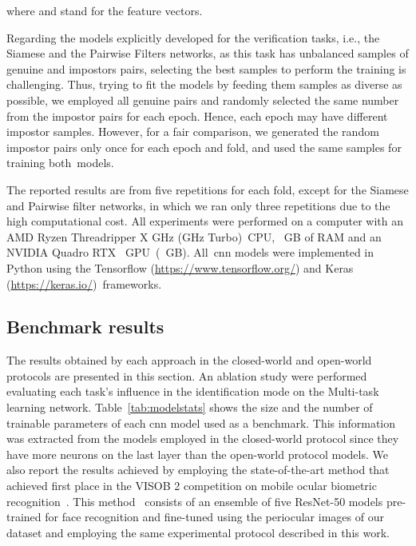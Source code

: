 \noindent where  and  stand for the feature vectors.

Regarding the models explicitly developed for the verification tasks, i.e., the Siamese and the Pairwise Filters networks, as this task has unbalanced samples of genuine and impostors pairs, selecting the best samples to perform the training is challenging.
Thus, trying to fit the models by feeding them samples as diverse as possible, we employed all genuine pairs and randomly selected the same number from the impostor pairs for each epoch.
Hence, each epoch may have different impostor samples.
However, for a fair comparison, we generated the random impostor pairs only once for each epoch and fold, and used the same samples for training both~models.

The reported results are from five repetitions for each fold, except for the Siamese and Pairwise filter networks, in which we ran only three repetitions due to the high computational cost.
All experiments were performed on a computer with an AMD Ryzen Threadripper X GHz (GHz Turbo)~CPU, ~GB of RAM and an NVIDIA Quadro RTX~ GPU~(~GB).
All~\gls*{cnn} models were implemented in Python using the Tensorflow ({\small\url{https://www.tensorflow.org/}}) and Keras ({\small\url{https://keras.io/}})~frameworks.

\subsection{Benchmark results}

The results obtained by each approach in the closed-world and open-world protocols are presented in this section.
An ablation study were performed evaluating each task's influence in the identification mode on the Multi-task learning network.
Table~\ref{tab:modelstats} shows the size and the number of trainable parameters of each \gls*{cnn} model used as a benchmark.
This information was extracted from the models employed in the closed-world protocol since they have more neurons on the last layer than the open-world protocol models.
We also report the results achieved by employing the state-of-the-art method that achieved first place in the VISOB 2 competition on mobile ocular biometric recognition~\cite{nguyen2021visob}.
This method~\cite{zanlorensi2020deep} consists of an ensemble of five ResNet-50 models pre-trained for face recognition and fine-tuned using the periocular images of our dataset and employing the same experimental protocol described in this work.

